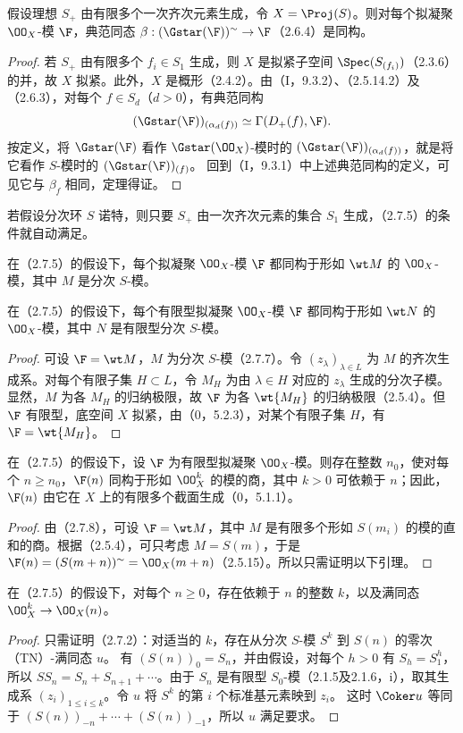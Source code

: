 假设理想 $S_+$ 由有限多个一次齐次元素生成，令 $X=\Proj(S)$。则对每个拟凝聚 $\OO_X$-模 $\F$，典范同态
$\beta:(\Gstar(\F))^\sim\to\F$（2.6.4）是同构。
\begin{proof}
若 $S_+$ 由有限多个 $f_i\in S_1$ 生成，则 $X$ 是拟紧子空间
$\Spec(S_{(f_i)})$（2.3.6）的并，故 $X$ 拟紧。此外，$X$ 是概形（2.4.2）。由（I，9.3.2）、（2.5.14.2）及（2.6.3），对每个 $f\in S_d$（$d>0$），有典范同构
\[
(\Gstar(\F))_{(\alpha_d(f))}\simeq\Gamma(D_+(f),\F).
\]
按定义，将 $\Gstar(\F)$ 看作 $\Gstar(\OO_X)$-模时的
$(\Gstar(\F))_{(\alpha_d(f))}$，就是将它看作 $S$-模时的 $(\Gstar(\F))_{(f)}$。
回到（I，9.3.1）中上述典范同构的定义，可见它与 $\beta_f$ 相同，定理得证。
\end{proof}

若假设分次环 $S$ 诺特，则只要 $S_+$ 由一次齐次元素的集合 $S_1$ 生成，（2.7.5）的条件就自动满足。

在（2.7.5）的假设下，每个拟凝聚 $\OO_X$-模 $\F$ 都同构于形如 $\wt M$ 的 $\OO_X$-模，其中 $M$ 是分次 $S$-模。

在（2.7.5）的假设下，每个有限型拟凝聚 $\OO_X$-模 $\F$ 都同构于形如 $\wt N$ 的 $\OO_X$-模，其中 $N$ 是有限型分次 $S$-模。
\begin{proof}
可设 $\F=\wt M$，$M$ 为分次 $S$-模（2.7.7）。令 $(z_\lambda)_{\lambda\in L}$ 为 $M$ 的齐次生成系。对每个有限子集 $H\subset L$，令 $M_H$ 为由 $\lambda\in H$ 对应的 $z_\lambda$ 生成的分次子模。显然，$M$ 为各 $M_H$ 的归纳极限，故 $\F$ 为各 $\wt{M_H}$ 的归纳极限（2.5.4）。但 $\F$ 有限型，底空间 $X$ 拟紧，由（0，5.2.3），对某个有限子集 $H$，有 $\F=\wt{M_H}$。
\end{proof}

在（2.7.5）的假设下，设 $\F$ 为有限型拟凝聚 $\OO_X$-模。则存在整数 $n_0$，使对每个 $n\geq n_0$，$\F(n)$ 同构于形如 $\OO_X^k$ 的模的商，其中 $k>0$ 可依赖于 $n$；因此，$\F(n)$ 由它在 $X$ 上的有限多个截面生成（0，5.1.1）。
\begin{proof}
由（2.7.8），可设 $\F=\wt M$，其中 $M$ 是有限多个形如 $S(m_i)$ 的模的直和的商。根据（2.5.4），可只考虑 $M=S(m)$，于是
$\F(n)=(S(m+n))^\sim=\OO_X(m+n)$（2.5.15）。所以只需证明以下引理。
\end{proof}

在（2.7.5）的假设下，对每个 $n\geq0$，存在依赖于 $n$ 的整数 $k$，以及满同态
$\OO_X^k\to\OO_X(n)$。
\begin{proof}
只需证明（2.7.2）：对适当的 $k$，存在从分次 $S$-模 $S^k$ 到 $S(n)$ 的零次（TN）-满同态 $u$。
有 $(S(n))_0=S_n$，并由假设，对每个 $h>0$ 有 $S_h=S_1^h$，所以
$SS_n=S_n+S_{n+1}+\cdots$。由于 $S_n$ 是有限型 $S_0$-模（2.1.5及2.1.6，i），取其生成系 $(z_i)_{1\leq i\leq k}$。令 $u$ 将 $S^k$ 的第 $i$ 个标准基元素映到 $z_i$。
这时 $\Coker u$ 等同于
$(S(n))_{-n}+\cdots+(S(n))_{-1}$，所以 $u$ 满足要求。
\end{proof}

